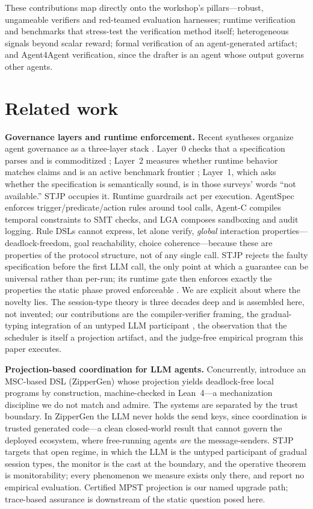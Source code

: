 \documentclass{article}
\newcommand{\stjp}{\textsc{STJP}}
\begin{document}
These contributions map directly onto the workshop's pillars---robust, ungameable verifiers and red-teamed evaluation harnesses; runtime verification and benchmarks that stress-test the verification method itself; heterogeneous signals beyond scalar reward; formal verification of an agent-generated artifact; and Agent4Agent verification, since the drafter is an agent whose output governs other agents.

\section{Related work}\label{sec:related}
\textbf{Governance layers and runtime enforcement.} Recent syntheses organize agent governance as a three-layer stack \citep{governspec,lga}. Layer~0 checks that a specification parses and is commoditized \citep{skilldex}; Layer~2 measures whether runtime behavior matches claims and is an active benchmark frontier \citep{besafe,stweb}; Layer~1, which asks whether the specification is semantically sound, is in those surveys' words ``not available.'' \stjp{} occupies it. Runtime guardrails act per execution. AgentSpec \citep{agentspec} enforces trigger/predicate/action rules around tool calls, Agent-C \citep{agentc} compiles temporal constraints to SMT checks, and LGA \citep{lga} composes sandboxing and audit logging. Rule DSLs cannot express, let alone verify, \emph{global} interaction properties---deadlock-freedom, goal reachability, choice coherence---because these are properties of the protocol structure, not of any single call. \stjp{} rejects the faulty specification before the first LLM call, the only point at which a guarantee can be universal rather than per-run; its runtime gate then enforces exactly the properties the static phase proved enforceable \citep{bocchi13}. We are explicit about where the novelty lies. The session-type theory is three decades deep and is assembled here, not invented; our contributions are the compiler-verifier framing, the gradual-typing integration of an untyped LLM participant \citep{igarashi17}, the observation that the scheduler is itself a projection artifact, and the judge-free empirical program this paper executes.

\textbf{Projection-based coordination for LLM agents.} Concurrently, \citet{bollig26} introduce an MSC-based DSL (ZipperGen) whose projection yields deadlock-free local programs by construction, machine-checked in Lean~4---a mechanization discipline we do not match and admire. The systems are separated by the trust boundary. In ZipperGen the LLM never holds the send keys, since coordination is trusted generated code---a clean closed-world result that cannot govern the deployed ecosystem, where free-running agents \emph{are} the message-senders. \stjp{} targets that open regime, in which the LLM is the untyped participant of gradual session types, the monitor is the cast at the boundary, and the operative theorem is monitorability; every phenomenon we measure exists only there, and \citet{bollig26} report no empirical evaluation. Certified MPST projection \citep{listutz23,liwies25} is our named upgrade path; trace-based assurance \citep{paduraru26} is downstream of the static question posed here.
\end{document}
